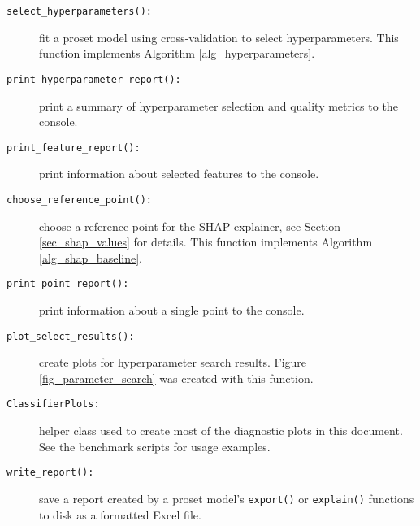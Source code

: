 \begin{description}
%
\begin{description}
\item[\texttt{select\_hyperparameters():}] fit a proset model using cross-validation to select hyperparameters.
This function implements Algorithm \ref{alg_hyperparameters}.
%
\item[\texttt{print\_hyperparameter\_report():}] print a summary of hyperparameter selection and quality metrics to the console.
%
\item[\texttt{print\_feature\_report():}] print information about selected features to the console.
%
\item[\texttt{choose\_reference\_point():}] choose a reference point for the SHAP explainer, see Section \ref{sec_shap_values} for details.
This function implements Algorithm \ref{alg_shap_baseline}.
%
\item[\texttt{print\_point\_report():}] print information about a single point to the console.
%
\item[\texttt{plot\_select\_results():}] create plots for hyperparameter search results.
Figure \ref{fig_parameter_search} was created with this function.
%
\item[\texttt{ClassifierPlots:}] helper class used to create most of the diagnostic plots in this document.
See the benchmark scripts for usage examples.
%
\item[\texttt{write\_report():}] save a report created by a proset model's \texttt{export()} or \texttt{explain()} functions to disk as a formatted Excel file.
\end{description}
\end{description}
%
